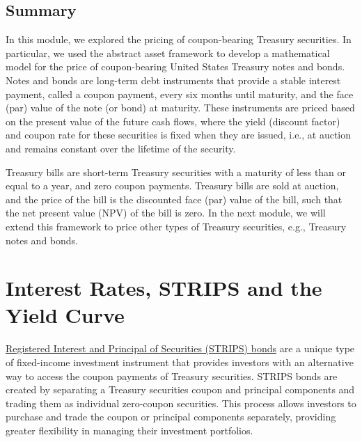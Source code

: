 \documentclass[11pt]{article}
\theoremstyle{definition}
\begin{document}
\subsection{Summary}
In this module, we explored the pricing of coupon-bearing Treasury securities.
In particular, we used the abstract asset framework to develop a mathematical model for the price of coupon-bearing United States Treasury notes and bonds.
Notes and bonds are long-term debt instruments that provide a stable interest payment, called a coupon payment, every six months until maturity, and the face (par) value of the note (or bond) at maturity.
These instruments are priced based on the present value of the future cash flows, where the yield (discount factor) and coupon rate for these securities is fixed when they are issued, i.e., at auction and remains constant over the lifetime of the security.

Treasury bills are short-term Treasury securities with a maturity of less than or equal to a year, and zero coupon payments.
Treasury bills are sold at auction, and the price of the bill is the discounted face (par) value of the bill, such that the net present value (NPV) of the bill is zero.
In the next module, we will extend this framework to price other types of Treasury securities, e.g., Treasury notes and bonds.

\section{Interest Rates, STRIPS and the Yield Curve}
\href{https://en.wikipedia.org/wiki/United_States_Treasury_security#STRIPS}{Registered Interest and Principal of Securities (STRIPS) bonds} are a 
unique type of fixed-income investment instrument that provides investors with an alternative way to access the coupon payments of 
Treasury securities. STRIPS bonds are created by separating a Treasury securities coupon and principal components and trading them as individual 
zero-coupon securities. This process allows investors to purchase and trade the coupon or principal components separately, 
providing greater flexibility in managing their investment portfolios.
\end{document}
